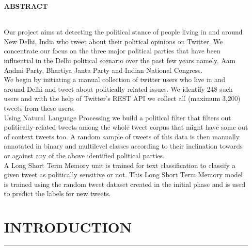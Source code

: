 \documentclass[a4paper,11pt]{article}
\begin{document}
\newpage
{\LARGE \bfseries ABSTRACT}
\vspace*{5mm}
\medskip\\
Our project aims at detecting the political stance of people living in and around New Delhi, India who tweet about their political opinions on Twitter. We concentrate our focus on the three major political parties that have been influential in the Delhi political scenario over the past few years namely, Aam Aadmi Party, Bhartiya Janta Party and Indian National Congress.
\medskip\\
We begin by initiating a  manual  collection  of  twitter users who live in and around Delhi and tweet about politically related issues. We identify 248 such users and with the help of Twitter's REST API we collect all (maximum 3,200) tweets from these users. 
\medskip\\
Using Natural Language Processing we build a political filter that filters out politically-related tweets among the whole tweet corpus that might have some out of context tweets too. A random sample of tweets of this data is then manually annotated in binary and multilevel classes according to their inclination towards or against any of the above identified political parties. 
\medskip\\
A Long Short Term Memory unit is trained for text classification to classify a given tweet as politically sensitive or not. This Long Short Term Memory model is trained using the random tweet dataset created in the initial phase and is used to predict the labels for new tweets.

\newpage
\tableofcontents
\newpage

\listoffigures
{} 
\listoftables
{}

\newpage
{}
\setcounter{page}{6}
\section{INTRODUCTION}
\hrule
\vspace*{5mm}
\end{document}

